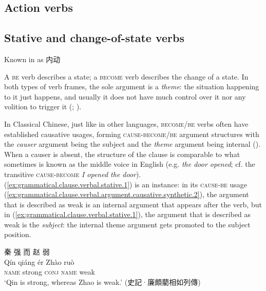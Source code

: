 \documentclass[UTF8, a4paper, oneside, scheme=plain, 12pt]{ctexrep}
\newcommand*{\citepage}[1]{p.~{#1}}
\newcommand*{\term}[1]{\emph{#1}}
\newcommand{\form}[1]{\emph{#1}}
\newcommand{\translate}[1]{`#1'}
\newcommand*{\category}[1]{\textsc{#1}}
\begin{document}
\subsection{Action verbs}\label{sec:valency.intransitive.action}

\subsection{Stative and change-of-state verbs}
\label{sec:valency.simple.state-and-change}

Known in \citet{meiguang2018} as 内动

A \category{be} verb describes a state;
a \category{become} verb describes the change of a state.
In both types of verb frames,
the sole argument is a \term{theme}:
the situation happening to it just happens,
and usually it does not have much control over it nor any volition to trigger it
(\citealt[\citepage{345}]{li2004grammar}; \citealt[\citepage{275}]{meiguang2018}).

In Classical Chinese, just like in other languages,
\category{become}/\category{be} verbs often have established causative usages,
forming \category{cause}-\category{become}/\category{be} argument structures
with the \term{causer} argument being the subject and the \term{theme} argument being internal
().
When a causer is absent, the structure of the clause 
is comparable to what sometimes is known as the middle voice in English
(e.g. \form{the door opened}; cf. the transitive \category{cause}-\category{become} \form{I opened the door}).
(\ref{ex:grammatical.clause.verbal.stative.1}) is an instance:
in its \category{cause}-\category{be} usage (\ref{ex:grammatical.clause.verbal.argument.causative.synthetic.2}),
the argument that is described as weak is an internal argument that appears after the verb,
but in (\ref{ex:grammatical.clause.verbal.stative.1}),
the argument that is described as weak is the \emph{subject}:
the internal theme argument gets promoted to the subject position.

\begin{exe}
    \ex\label{ex:grammatical.clause.verbal.stative.1}
    \glll 秦 强 而 赵 弱 \\
    Qín qiáng ér Zhào ruò \\
    \category{name} strong \category{conj} \category{name} weak \\
    \glt\translate{Qin is strong, whereas Zhao is weak.} \hfill (史記·廉頗藺相如列傳)
\end{exe}
\end{document}
